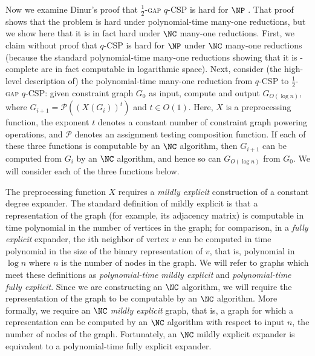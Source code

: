 Now we examine Dinur's proof that \textsc{$\frac{1}{2}$-gap $q$-CSP} is hard for $\NP$ \autocite{dinur07}.
That proof shows that the problem is hard under polynomial-time many-one reductions, but we show here that it is in fact hard under $\NC$ many-one reductions.
First, we claim without proof that \textsc{$q$-CSP} is hard for $\NP$ under $\NC$ many-one reductions (because the standard polynomial-time many-one reductions showing that it is \NP-complete are in fact computable in logarithmic space).
Next, consider (the high-level description of) the polynomial-time many-one reduction from \textsc{$q$-CSP} to \textsc{$\frac{1}{2}$-gap $q$-CSP}: given constraint graph $G_0$ as input, compute and output $G_{O(\log n)}$, where $G_{i + 1} = \mathcal{P}({\left(X(G_i)\right)}^t)$ and $t \in O(1)$.
Here, $X$ is a preprocessing function, the exponent $t$ denotes a constant number of constraint graph powering operations, and $\mathcal{P}$ denotes an assignment testing composition function.
If each of these three functions is computable by an $\NC$ algorithm, then $G_{i + 1}$ can be computed from $G_i$ by an $\NC$ algorithm, and hence so can $G_{O(\log n)}$ from $G_0$.
We will consider each of the three functions below.

The preprocessing function $X$ requires a \emph{mildly explicit} construction of a constant degree expander.
The standard definition of mildly explicit is that a representation of the graph (for example, its adjacency matrix) is computable in time polynomial in the number of vertices in the graph; for comparison, in a \emph{fully explicit} expander, the $i$th neighbor of vertex $v$ can be computed in time polynomial in the size of the binary representation of $v$, that is, polynomial in $\log n$ where $n$ is the number of nodes in the graph.
We will refer to graphs which meet these definitions as \emph{polynomial-time mildly explicit} and \emph{polynomial-time fully explicit}.
Since we are constructing an $\NC$ algorithm, we will require the representation of the graph to be computable by an $\NC$ algorithm.
More formally, we require an \emph{$\NC$ mildly explicit} graph, that is, a graph for which a representation can be computed by an $\NC$ algorithm with respect to input $n$, the number of nodes of the graph.
Fortunately, an $\NC$ mildly explicit expander is equivalent to a polynomial-time fully explicit expander.

